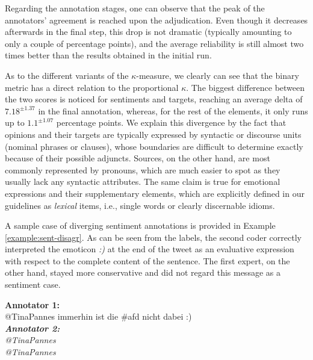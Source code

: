 Regarding the annotation stages, one can observe that the peak of the
annotators' agreement is reached upon the adjudication.  Even though
it decreases afterwards in the final step, this drop is not dramatic
(typically amounting to only a couple of percentage points), and the
average reliability is still almost two times better than the results
obtained in the initial run.

As to the different variants of the $\kappa$-measure, we clearly can
see that the binary metric has a direct relation to the proportional
$\kappa$.  The biggest difference between the two scores is noticed
for sentiments and targets, reaching an average delta of
$7.18^{\pm1.37}$ in the final annotation, whereas, for the rest of the
elements, it only runs up to $1.1^{\pm1.07}$ percentage points.  We
explain this divergence by the fact that opinions and their targets
are typically expressed by syntactic or discourse units (nominal
phrases or clauses), whose boundaries are difficult to determine
exactly because of their possible adjuncts.  Sources, on the other
hand, are most commonly represented by pronouns, which are much easier
to spot as they usually lack any syntactic attributes.  The same claim
is true for emotional expressions and their supplementary elements,
which are explicitly defined in our guidelines as \emph{lexical}
items, i.e., single words or clearly discernable idioms.

A sample case of diverging sentiment annotations is provided in
Example \ref{example:sent-disagr}.  As can be seen from the labels, the
second coder correctly interpreted the emoticon \emph{:)} at the end
of the tweet as an evaluative expression with respect to the complete
content of the sentence.  The first expert, on the other hand, stayed
more conservative and did not regard this message as a sentiment case.

{
  \renewcommand{\thesection}{\arabic{section}}
  \begin{example}\label{example:sent-disagr}
    \textbf{Annotator 1:}\\
    \upshape{}@TinaPannes immerhin ist die \#afd nicht
      dabei :)\\[0.8em]\itshape
    \textbf{Annotator 2:}\\
    \upshape{}@TinaPannes \sentiment{\textcolor{red}{immerhin ist die
        \#afd nicht dabei :)}}\\[0.8em]
    \noindent\itshape{}@TinaPannes
    \upshape{}
  \end{example}
}


